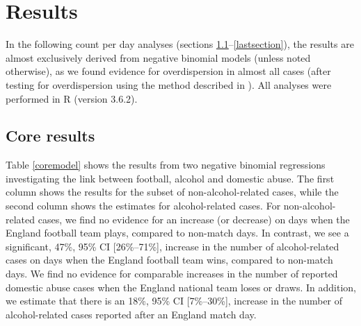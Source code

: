 \documentclass[12pt, a4paper]{article}
\begin{document}
\newpage

\section{Results}

In the following count per day analyses (sections \ref{firstsection}--\ref{lastsection}), the results are almost exclusively derived from negative binomial models (unless noted otherwise), as we found evidence for overdispersion in almost all cases (after testing for overdispersion using the method described in ). All analyses were performed in R (version 3.6.2).


\subsection{Core results} \label{firstsection}

Table \ref{coremodel} shows the results from two negative binomial regressions investigating the link between football, alcohol and domestic abuse. The first column shows the results for the subset of non-alcohol-related cases, while the second column shows the estimates for alcohol-related cases. For non-alcohol-related cases, we find no evidence for an increase (or decrease) on days when the England football team plays, compared to non-match days. In contrast, we see a significant, 47\%, 95\% CI [26\%--71\%], increase in the number of alcohol-related cases on days when the England football team wins, compared to non-match days. We find no evidence for comparable increases in the number of reported domestic abuse cases when the England national team loses or draws. In addition, we estimate that there is an 18\%, 95\% CI [7\%--30\%], increase in the number of alcohol-related cases reported after an England match day. 
\end{document}
